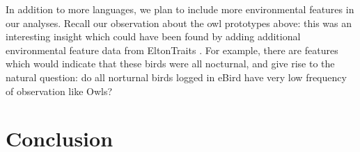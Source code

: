 \documentclass[10pt,letterpaper]{article}
\begin{document}
In addition to more languages, we plan to include more environmental features in our analyses. Recall our observation about the owl prototypes above: this was an interesting insight which could have been found by adding additional environmental feature data from EltonTraits \cite{wilman2014eltontraits}. For example, there are features which would indicate that these birds were all nocturnal, and give rise to the natural question: do all norturnal birds logged in eBird have very low frequency of observation like Owls?

\section{Conclusion}





\end{document}

